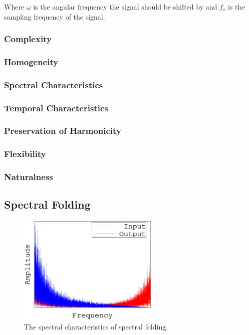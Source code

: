		Where $\omega$ is the angular frequency the signal should be shifted by and $f_{s}$ is the sampling
		frequency of the signal.

		\subsubsection*{Complexity}
		\subsubsection*{Homogeneity}
		\subsubsection*{Spectral Characteristics}
		\subsubsection*{Temporal Characteristics}
		\subsubsection*{Preservation of Harmonicity}
		\subsubsection*{Flexibility}
		\subsubsection*{Naturalness}

	\subsection{Spectral Folding}
	\label{sec:Excitation-SpectralFolding}
	
		\begin{figure}[h!]
			\centering
			\includegraphics[width=0.6\textwidth]{chapter3/Images/SpectralFolding.eps}
			\caption{The spectral characteristics of spectral folding.}
			\label{fig:SpectralFolding}
		\end{figure}

